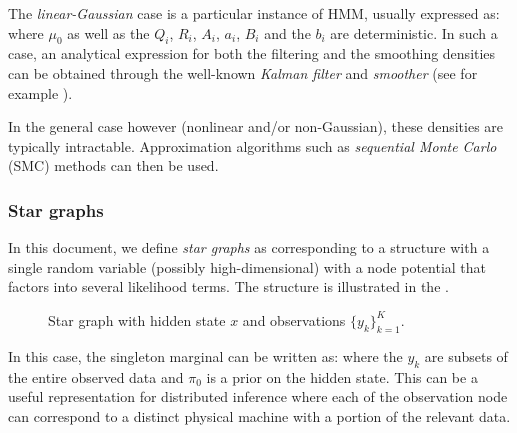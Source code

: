 The \emph{linear-Gaussian} case is a particular instance of HMM, usually expressed as:
where $\mu_0$ as well as the $Q_i$, $R_i$, $A_i$, $a_i$, $B_i$ and the $b_i$ are deterministic. In such a case, an analytical expression for both the filtering and the smoothing densities can be obtained through the well-known \emph{Kalman filter} and \emph{smoother} (see for example \citet{anderson79}). 

In the general case however (nonlinear and/or non-Gaussian), these densities are typically intractable. Approximation algorithms such as \emph{sequential Monte Carlo} (SMC) methods can then be used.  

\subsubsection{Star graphs}

In this document, we define \emph{star graphs} as corresponding to a structure with a single random variable (possibly high-dimensional) with a node potential that factors into several likelihood terms. The structure is illustrated in the . 

\begin{figure}[!h]
\center
{}
\caption{\label{fig:star1} Star graph with hidden state $x$ and observations $\{y_k\}_{k=1}^{K}$. }
\end{figure} 

In this case, the singleton marginal can be written as:
where the $y_k$ are subsets of the entire observed data and $\pi_0$ is a prior on the hidden state. This can be a useful representation for distributed inference where each of the observation node can correspond to a distinct physical machine with a portion of the relevant data.%

